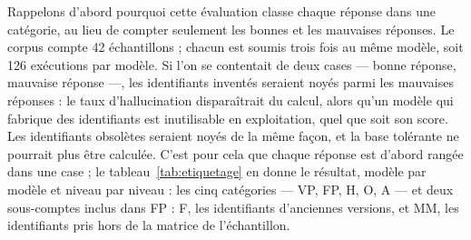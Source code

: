 Rappelons d'abord pourquoi cette évaluation classe chaque réponse dans une catégorie, au lieu de compter seulement les bonnes et les mauvaises réponses. Le corpus compte 42 échantillons ; chacun est soumis trois fois au même modèle, soit 126 exécutions par modèle. Si l'on se contentait de deux cases --- bonne réponse, mauvaise réponse ---, les identifiants inventés seraient noyés parmi les mauvaises réponses : le taux d'hallucination disparaîtrait du calcul, alors qu'un modèle qui fabrique des identifiants est inutilisable en exploitation, quel que soit son score. Les identifiants obsolètes seraient noyés de la même façon, et la base tolérante ne pourrait plus être calculée. C'est pour cela que chaque réponse est d'abord rangée dans une case ; le tableau~\ref{tab:etiquetage} en donne le résultat, modèle par modèle et niveau par niveau : les cinq catégories --- VP, FP, H, O, A --- et deux sous-comptes inclus dans FP : F, les identifiants d'anciennes versions, et MM, les identifiants pris hors de la matrice de l'échantillon.


